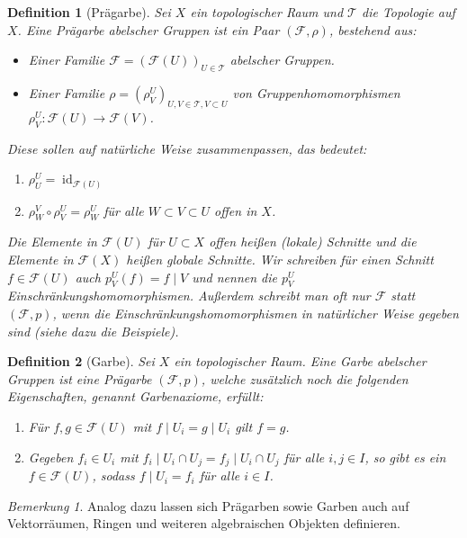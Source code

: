 \documentclass[11pt,a4paper,toc=bibliography]{scrartcl}
\theoremstyle{def}
\newtheorem{defi}{Definition}[section]
\theoremstyle{thm}
\theoremstyle{remark}
\newtheorem*{bem}{Bemerkung}
\DeclareMathOperator{\id}{id}
\renewcommand{\labelenumi}{(\roman{enumi})} %
\begin{document}
\begin{defi}[Prägarbe]
Sei $X$ ein topologischer Raum und $\mathcal{T}$ die Topologie auf $X$. Eine \emph{Prägarbe} abelscher Gruppen ist ein Paar $(\mathcal{F},\rho)$, bestehend aus:
\begin{itemize}
\item
Einer Familie $\mathcal{F}=(\mathcal{F}(U))_{U\in \mathcal{T}}$ abelscher Gruppen.
\item
Einer Familie $\rho=(\rho^U_V)_{U,V\in\mathcal{T}, V \subset
U}$ von Gruppenhomomorphismen $\rho^U_V:\mathcal{F}(U)\rightarrow \mathcal{F}(V)$.
\end{itemize}
Diese sollen auf natürliche Weise zusammenpassen, das bedeutet:
\begin{enumerate}
\item $
\rho^U_U =\textstyle{ \id_{\mathcal{F}(U)}}
$
\item $\rho_W^V\circ \rho_V^U=\rho_W^U$ für alle $W\subset V\subset U$ offen in $X$.
\end{enumerate}

Die Elemente in $\mathcal{F}(U)$ für $U\subset X$ offen heißen \emph{(lokale) Schnitte} und die Elemente in $\mathcal{F}(X)$ heißen \emph{globale Schnitte}.
Wir schreiben für einen Schnitt $f\in\mathcal{F}(U)$ auch $p^U_V(f)=f \mid V$ und nennen die $p^U_V$ \emph{Einschränkungshomomorphismen}. Außerdem schreibt man oft nur $\mathcal{F}$ statt $(\mathcal{F},p)$, wenn die Einschränkungshomomorphismen in natürlicher Weise gegeben sind (siehe dazu die Beispiele).
\end{defi}
\begin{defi}[Garbe]
Sei $X$ ein topologischer Raum. Eine \emph{Garbe} abelscher Gruppen ist eine Prägarbe $(\mathcal{F},p)$, welche zusätzlich noch die folgenden Eigenschaften, genannt \emph{Garbenaxiome}, erfüllt:
\renewcommand{\labelenumi}{(\roman{enumi})}
\begin{enumerate}
\item
Für $f,g\in \mathcal{F}(U)$ mit $f\mid U_i = g\mid U_i$ gilt $f=g$.
\item
Gegeben $f_i\in U_i$ mit 
$f_i\mid U_i\cap U_j = f_j\mid U_i\cap U_j$ für alle $i,j\in I$,
so gibt es ein $f\in \mathcal{F}(U)$, sodass $f\mid U_i= f_i$ für alle $i\in I$.
\end{enumerate}
\end{defi}
\begin{bem}
Analog dazu lassen sich Prägarben sowie Garben auch auf Vektorräumen, Ringen und weiteren algebraischen Objekten definieren. 
\end{bem}
\end{document}
